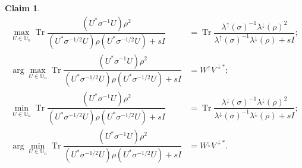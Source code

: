 \documentclass[10pt,reqno]{amsart}
\theoremstyle{break-italic}
\theoremstyle{break-italic}
\theoremstyle{break-italic}
\theoremstyle{break-italic}
\theoremstyle{break-italic}
\theoremstyle{break-italic}
\theoremstyle{break-italic}
\theoremstyle{break-italic}
\theoremstyle{break-roman}
\theoremstyle{standard}
\newtheorem{claim}[satz]{Claim}
\theoremstyle{varthm-roman}
\theoremstyle{varthm-italic}
\theoremstyle{varthm-roman-break}
\theoremstyle{varthm-italic-break}
\theoremstyle{varthm-roman-no-punctuation}
\theoremstyle{varthm-italic-no-punctuation}
\numberwithin{equation}{section}
\begin{document}
\begin{claim}\label{claimA} 
\begin{align*}
\max_{U\in\mathbb U_n} \operatorname{Tr}\dfrac{(U^*\sigma^{-1}U)\rho^2}{(U^*\sigma^{-1/2}U)\rho(U^*\sigma^{-1/2}U)+sI}&=\operatorname{Tr}\dfrac{\lambda^\uparrow(\sigma)^{-1}\lambda^\downarrow(\rho)^2}{\lambda^\uparrow(\sigma)^{-1}\lambda^\downarrow(\rho) +s I};\\
\arg\max_{U\in \mathbb U_n}\operatorname{Tr}\dfrac{(U^*\sigma^{-1}U)\rho^2}{(U^*\sigma^{-1/2}U)\rho(U^*\sigma^{-1/2}U)+sI}&=W^\uparrow V^{\downarrow*};\\
\min_{U\in\mathbb U_n}\operatorname{Tr}\dfrac{(U^*\sigma^{-1}U)\rho^2}{(U^*\sigma^{-1/2}U)\rho(U^*\sigma^{-1/2}U)+sI}&= \operatorname{Tr}\dfrac{\lambda^\downarrow(\sigma)^{-1}\lambda^\downarrow(\rho)^2}{\lambda^\downarrow(\sigma)^{-1}\lambda^\downarrow(\rho) +s I};\\
\arg\min_{U\in \mathbb U_n} \operatorname{Tr}\dfrac{(U^*\sigma^{-1}U)\rho^2}{(U^*\sigma^{-1/2}U)\rho(U^*\sigma^{-1/2}U)+sI}&=W^\downarrow V^{\downarrow*}.
\end{align*}
\end{claim}
\end{document}
